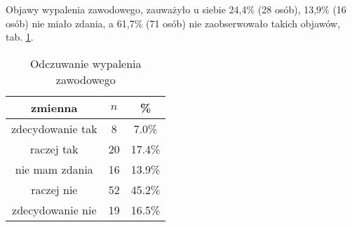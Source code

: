 Objawy wypalenia zawodowego, zauważyło u siebie 24,4\% (28 osób), 13,9\% (16 osób) nie miało zdania, a 61,7\% (71 osób) nie zaobserwowało takich objawów, tab. \ref{tab:Q35}.

\begin{table}[H]
\caption{Odczuwanie wypalenia zawodowego}
\centering
\begin{tabular}{ | c | c | c |}
\hline
zmienna & $n$ & \% \\
\hline
zdecydowanie tak  &  8  & 7.0\% \\
\hline
raczej tak  &  20  & 17.4\% \\
\hline
nie mam zdania  &  16  & 13.9\% \\
\hline
raczej nie  &  52  & 45.2\% \\
\hline
zdecydowanie nie  &  19  & 16.5\% \\
\hline
\end{tabular}
\label{tab:Q35}
\end{table}
